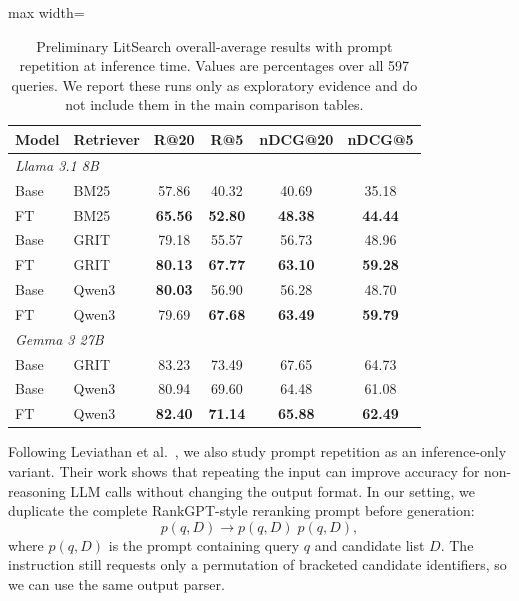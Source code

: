 \documentclass[pdflatex,sn-basic,Numbered]{sn-jnl}%
\theoremstyle{thmstyleone}%
\theoremstyle{thmstyletwo}%
\theoremstyle{thmstylethree}%
\begin{document}
\begin{table}[htbp]


\centering
\renewcommand{\arraystretch}{1.1}
\setlength{\tabcolsep}{3.5pt}
\footnotesize
\begin{adjustbox}{max width=\linewidth}
\begin{tabular}{l l c c c c}
\hline
Model & Retriever & R@20 & R@5 & nDCG@20 & nDCG@5 \\
\hline
\multicolumn{6}{l}{\textit{Llama 3.1 8B}} \\
Base & BM25  & 57.86 & 40.32 & 40.69 & 35.18 \\
FT   & BM25  & \textbf{65.56} & \textbf{52.80} & \textbf{48.38} & \textbf{44.44} \\
Base & GRIT  & 79.18 & 55.57 & 56.73 & 48.96 \\
FT   & GRIT  & \textbf{80.13} & \textbf{67.77} & \textbf{63.10} & \textbf{59.28} \\
Base & Qwen3 & \textbf{80.03} & 56.90 & 56.28 & 48.70 \\
FT   & Qwen3 & 79.69 & \textbf{67.68} & \textbf{63.49} & \textbf{59.79} \\
\hline
\multicolumn{6}{l}{\textit{Gemma 3 27B}} \\
Base & GRIT  & 83.23 & 73.49 & 67.65 & 64.73 \\
Base & Qwen3 & 80.94 & 69.60 & 64.48 & 61.08 \\
FT   & Qwen3 & \textbf{82.40} & \textbf{71.14} & \textbf{65.88} & \textbf{62.49} \\
\hline
\end{tabular}
\end{adjustbox}


\caption{Preliminary LitSearch overall-average results with prompt repetition at
inference time. Values are percentages over all 597 queries. We report these runs
only as exploratory evidence and do not include them in the main comparison
tables.}
\label{tab:prompt-repetition}
\end{table}

Following Leviathan et al.~\cite{Leviathan}, we also study prompt repetition as
an inference-only variant. Their work shows that repeating the input can improve
accuracy for non-reasoning LLM calls without changing the output format. In our
setting, we duplicate the complete RankGPT-style reranking prompt before
generation:
\[
p(q, D) \rightarrow p(q, D)\;p(q, D),
\]
where $p(q, D)$ is the prompt containing query $q$ and candidate list $D$. The
instruction still requests only a permutation of bracketed candidate identifiers,
so we can use the same output parser.
\end{document}
